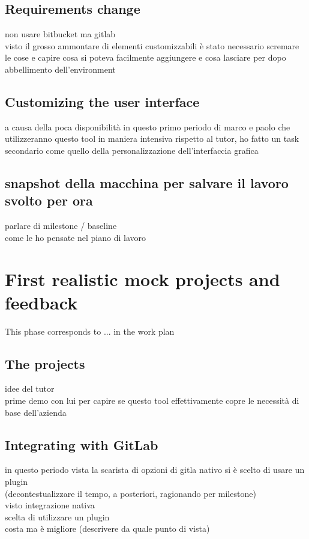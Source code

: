	\subsection{Requirements change}
		non usare bitbucket ma gitlab\\
		visto il grosso ammontare di elementi customizzabili è stato necessario scremare le cose e capire cosa si poteva facilmente aggiungere e cosa lasciare per dopo\\
		abbellimento dell'environment
		

	\subsection{Customizing the user interface}
		a causa della poca disponibilità in questo primo periodo di marco e paolo che utilizzeranno questo tool in maniera intensiva rispetto al tutor, ho fatto un task secondario come quello della personalizzazione dell'interfaccia grafica
	
	
	\subsection{snapshot della macchina per salvare il lavoro svolto per ora}
		parlare di milestone / baseline\\
		come le ho pensate nel piano di lavoro

\section{First realistic mock projects and feedback}

	This phase corresponds to ... in the work plan

	\subsection{The projects}
		idee del tutor\\
		prime demo con lui per capire se questo tool effettivamente copre le necessità di base dell'azienda
		
	\subsection{Integrating with GitLab}
		in questo periodo vista la scarista di opzioni di gitla nativo si è scelto di usare un plugin\\
		(decontestualizzare il tempo, a posteriori, ragionando per milestone)\\
		visto integrazione nativa\\
		scelta di utilizzare un plugin\\
		costa ma è migliore (descrivere da quale punto di vista)
	
